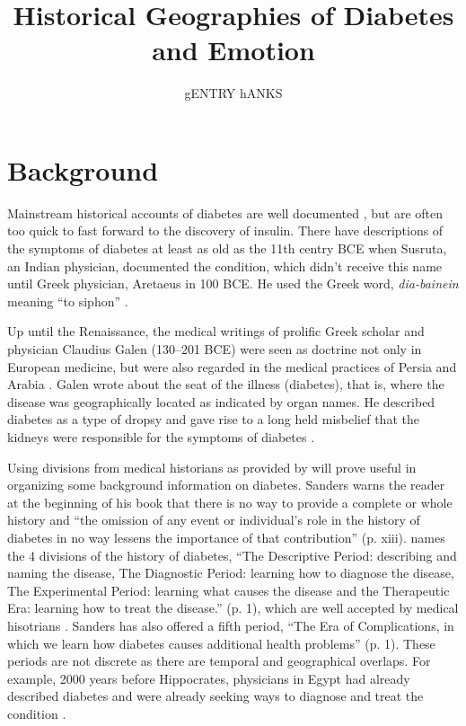 \documentclass[12pt]{article}
\title{Historical Geographies of Diabetes and Emotion}
\author{gENTRY hANKS}
\begin{document}
\maketitle



\newpage
\section{Background}
\doublespacing
Mainstream historical accounts of diabetes are well documented \citep{engelhardt_diabetes_1989, tattersall_diabetes_2009}, but are often too quick to fast forward to the discovery of insulin. There have descriptions of the symptoms of diabetes at least as old as the 11th centry BCE when Susruta, an Indian physician, documented the condition, which didn't receive this name until Greek physician, Aretaeus in 100 BCE. He used the Greek word, \textit {dia-bainein} meaning ``to siphon'' \citep{sattley_history_1996}.  

Up until the Renaissance, the medical writings of prolific Greek scholar and physician Claudius Galen (130--201 BCE) were seen as doctrine not only in European medicine, but were also regarded in the medical practices of Persia and Arabia \citep{henschen_1969_term}. Galen wrote about the seat of the illness (diabetes), that is, where the disease was geographically located as indicated by organ names. He described diabetes as a type of dropsy and gave rise to a long held misbelief that the kidneys were responsible for the symptoms of diabetes \citep{henschen_1969_term}. 

Using divisions from medical historians as provided by \citet{sanders_2001_philatelic} will prove useful in organizing some background information on diabetes. Sanders warns the reader at the beginning of his book that there is no way to provide a complete or whole history and ``the omission of any event or individual's role in the history of diabetes in no way lessens the importance of that contribution'' (p. xiii). 
\citet{sanders_2001_philatelic} names the 4 divisions of the history of diabetes, ``The Descriptive Period: describing and naming the disease, The Diagnostic Period: learning how to diagnose the disease, The Experimental Period: learning what causes the disease and the Therapeutic Era: learning how to treat the disease.'' (p. 1), which are well accepted by medical hisotrians \citep{papaspyros_1964_history}. Sanders has also offered a fifth period, ``The Era of Complications, in which we learn how diabetes causes additional health problems'' (p. 1). These periods are not discrete as there are temporal and geographical overlaps. For example, 2000 years before Hippocrates, physicians in Egypt had already described diabetes and were already seeking ways to diagnose and treat the condition \citep{sanders_2001_philatelic}. 
\end{document}
